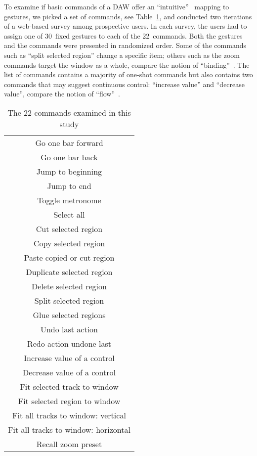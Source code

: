 \documentclass{aes130}
\begin{document}
To examine if basic commands of a DAW offer an ``intuitive''~\cite{Naumann:2007:IUU:1784197.1784212} mapping to gestures, we picked a set of commands, see Table~\ref{commands}, and conducted two iterations of a web-based survey among prospective users. In each survey, the users had to assign one of 30~fixed gestures to each of the 22~commands. Both the gestures and the commands were presented in randomized order. Some of the commands such as ``split selected region'' change a specific item; others such as the zoom commands target the window as a whole, compare the notion of ``binding''~\cite{Wobbrock:2009:UGS:1518701.1518866}. The list of commands contains a majority of one-shot commands but also contains two commands that may suggest continuous control: ``increase value'' and ``decrease value'', compare the notion of ``flow''~\cite{Wobbrock:2009:UGS:1518701.1518866}.

\begin{table}
\begin{center}
\begin{tabular}{c}
Go one bar forward\\
Go one bar back\\
Jump to beginning\\
Jump to end\\
Toggle metronome\\
Select all\\
Cut selected region\\
Copy selected region\\
Paste copied or cut region\\
Duplicate selected region\\
Delete selected region\\
Split selected region\\
Glue selected regions\\ 
Undo last action\\
Redo action undone last\\
Increase value of a control\\
Decrease value of a control\\
Fit selected track to window\\
Fit selected region to window\\
Fit all tracks to window: vertical\\
Fit all tracks to window: horizontal\\
Recall zoom preset
\end{tabular}
\end{center}
\caption{\label{commands}The 22 commands examined in this study}
\end{table}
\end{document}
